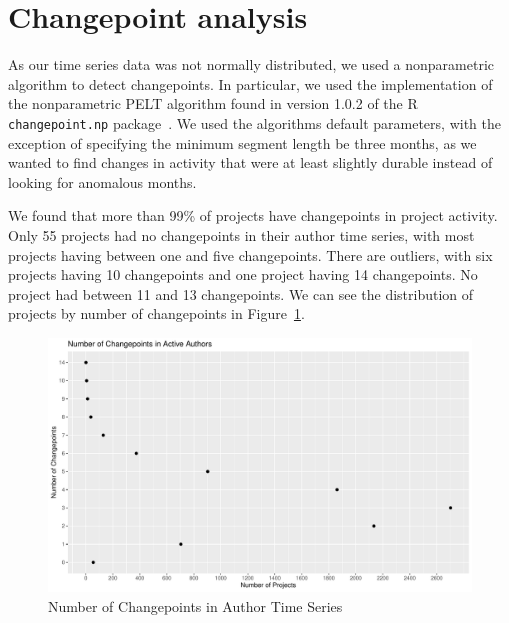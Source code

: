 \documentclass[10pt,conference]{IEEEtran}
\begin{document}
\section{Changepoint analysis}

As our time series data was not normally distributed, we used a nonparametric algorithm to detect changepoints. In particular, we used the implementation of the nonparametric PELT algorithm found in version 1.0.2 of the R \texttt{changepoint.np} package~\cite{killick2014changepoint}. We used the algorithms default parameters, with the exception of specifying the minimum segment length be three months, as we wanted to find changes in activity that were at least slightly durable instead of looking for anomalous months. 


We found that more than 99\% of projects have changepoints in project activity. Only 55 projects had no changepoints in their author time series, with most projects having between one and five changepoints. There are outliers, with six projects having 10 changepoints and one project having 14 changepoints. No project had between 11 and 13 changepoints. We can see the distribution of projects by number of changepoints in Figure~\ref{fig:authorcpts}.
\begin{figure}[ht!]
    \centering
    \includegraphics[width=\linewidth]{author-changepoints.pdf}
    \caption{Number of Changepoints in Author Time Series}
    \label{fig:authorcpts}
\end{figure}
\end{document}
